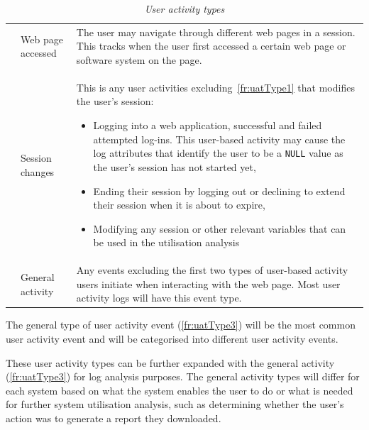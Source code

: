 \begin{table}[!htb]
	\centering
	\caption[User activity types]
	{\textit{User activity types}}
	\label{tbl:ch2_userActivityTypes}
	\begin{tabularx}{\textwidth}{llX}
		\toprule
		\thead{Req. ID} & \thead{Activity Type} & \thead{Description} \\
		\midrule

		\rowcolor{lightgray}
		\subsubphase{fr:uatType1} & Web page accessed & The user may navigate through different web pages in a session. This tracks when the user first accessed a certain web page or software system on the page. \\


		\subsubphase{fr:uatType2} & Session changes & This is any user activities excluding~\ref{fr:uatType1} that modifies the user's session:
		\begin{itemize}
			\item Logging into a web application, successful and failed attempted log-ins. This user-based activity may cause the log attributes that identify the user to be a \texttt{NULL} value as the user's session has not started yet,
			\item Ending their session by logging out or declining to extend their session when it is about to expire,
			\item Modifying any session or other relevant variables that can be used in the utilisation analysis
		\end{itemize}\\

		\rowcolor{lightgray}
		\subsubphase{fr:uatType3} & General activity & Any events excluding the first two types of user-based activity users initiate when interacting with the web page. Most user activity logs will
		have this event type.\\ 
		\bottomrule
	\end{tabularx}
\end{table}

\clearpage

The general type of user activity event (\ref{fr:uatType3}) will be the most common user activity event and will be categorised into different user activity events. \par These user activity types can be further expanded with the general activity (\ref{fr:uatType3}) for log analysis purposes. The general activity types will differ for each system based on what the system enables the user to do or what is needed for further system utilisation analysis, such as determining whether the user's action was to generate a report they downloaded.

